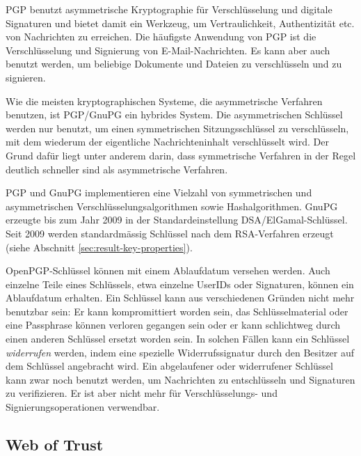 PGP benutzt asymmetrische Kryptographie für Verschlüsselung und
digitale Signaturen und bietet damit ein Werkzeug, um Vertraulichkeit,
Authentizität etc. von Nachrichten zu erreichen. Die häufigste
Anwendung von PGP ist die Verschlüsselung und Signierung von
E-Mail-Nachrichten. Es kann aber auch benutzt werden, um beliebige
Dokumente und Dateien zu verschlüsseln und zu signieren.

Wie die meisten kryptographischen Systeme, die asymmetrische Verfahren
benutzen, ist PGP/GnuPG ein hybrides System. Die asymmetrischen
Schlüssel werden nur benutzt, um einen symmetrischen
Sitzungsschlüssel zu verschlüsseln, mit dem wiederum der
eigentliche Nachrichteninhalt verschlüsselt wird. Der Grund dafür
liegt unter anderem darin, dass symmetrische Verfahren in der Regel
deutlich schneller sind als asymmetrische Verfahren.

PGP und GnuPG implementieren eine Vielzahl von symmetrischen und
asymmetrischen Verschl\"usselungsalgorithmen sowie
Hashalgorithmen. GnuPG erzeugte bis zum Jahr 2009 in der
Standardeinstellung DSA/ElGamal-Schlüssel. Seit 2009 werden
standardm\"assig Schl\"ussel nach dem RSA-Verfahren erzeugt (siehe Abschnitt
\ref{sec:result-key-properties}).

OpenPGP-Schlüssel können mit einem Ablaufdatum versehen
werden. Auch einzelne Teile eines Schlüssels, etwa einzelne UserIDs
oder Signaturen, können ein Ablaufdatum erhalten. Ein Schlüssel
kann aus verschiedenen Gründen nicht mehr benutzbar sein: Er kann
kompromittiert worden sein, das Schlüsselmaterial oder eine
Passphrase können verloren gegangen sein oder er kann schlichtweg
durch einen anderen Schlüssel ersetzt worden sein. In solchen
Fällen kann ein Schlüssel \emph{widerrufen} werden, indem eine
spezielle Widerrufssignatur durch den Besitzer auf dem Schlüssel
angebracht wird. Ein abgelaufener oder widerrufener Schlüssel kann
zwar noch benutzt werden, um Nachrichten zu entschlüsseln und
Signaturen zu verifizieren. Er ist aber nicht mehr für
Verschlüsselungs- und Signierungsoperationen verwendbar.

\subsection{Web of Trust}
\label{ch:Grundlagen:sec:PublicKeyCrypto:subsec:KeyAuth:subsubsec:WOT}

